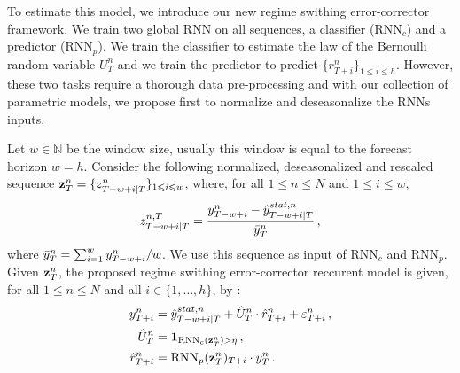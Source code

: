 \documentclass{article} %
\newcommand{\ts}{y}
\newcommand{\tspred}{\hat{\ts}}
\newcommand{\lag}{h}
\newcommand{\window}{w}
\newcommand{\meants}{\Bar{\ts}}
\newcommand{\rnnwindow}{{\bf \rnn}}
\newcommand{\rnn}{z}
\newcommand{\err}{err}
\newcommand{\threshold}{\eta}
\newcommand{\predictor}{\mathrm{RNN}_p}
\newcommand{\classifier}{\mathrm{RNN}_c}
\newcommand{\remainder}{r}
\newcommand{\hiddenregime}{U}
\begin{document}
To estimate this model, we introduce our new regime swithing error-corrector framework. We train two global RNN on all sequences, a classifier ($\classifier$) and a predictor ($\predictor$). We train the classifier to estimate the law of the Bernoulli random variable $\hiddenregime^n_T$ and we train the predictor to predict $\{\remainder^{n}_{T+i}\}_{1\leqslant i\leqslant \lag}$. However, these two tasks require a thorough data pre-processing and with our collection of parametric models, we propose first to normalize and deseasonalize the RNNs inputs.


Let $\window \in \mathbb{N}$ be the window size, usually this window is equal to the forecast horizon $\window = \lag$. Consider the following  normalized, deseasonalized and rescaled sequence $\rnnwindow^n_T = \{\rnn^{n}_{T-\window+i|T}\}_{1\leqslant i \leqslant w}$, where, for all $1\leqslant n \leqslant N$ and $1\leqslant i \leqslant w$, 
$$
\rnn^{n,T}_{T-w+i|T} = \frac{\ts^n_{T-w+i} -\tspred^{stat,n}_{T-w+i|T}}{\meants^n_T}\,,
$$
where $ \meants^n_T = \sum_{i = 1}^{w}  \ts^n_{T-w+i}/w$.
We use this sequence as input of  $\classifier$ and $\predictor$. %
 Given $\rnnwindow^n_T$, the proposed regime swithing error-corrector reccurent model is given, for all $1\leqslant n \leqslant N$ and all $i \in \{1,\ldots,\lag\}$, by :
\begin{align*}
\ts^n_{T+i}  &= \tspred^{stat,n}_{T-w+i|T} +  \hat{\hiddenregime}^n_T \cdot \hat{\remainder}^{n}_{T+i} + \varepsilon^n_{T+i}\,, \\
\hat{\hiddenregime}^n_T &= \mathbf{1}_{\classifier(\rnnwindow^n_T) > \threshold}\,, \\
\hat{\remainder}^{n}_{T+i} &= \predictor(\rnnwindow^n_T)_{T+i} \cdot \meants^n_T\,.
\end{align*}
\end{document}
